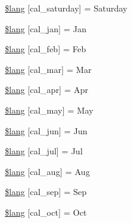 \begin{DoxyCompactItemize}
\hyperlink{system_2language_2english_2calendar__lang_8php_aff3fc79a60ccf1f09bfe1f4387105c4b}{\$lang} \mbox{[}\textquotesingle{}cal\+\_\+saturday\textquotesingle{}\mbox{]} = \textquotesingle{}Saturday\textquotesingle{}
\item 
\hyperlink{system_2language_2english_2calendar__lang_8php_a830b34d4425cdab2632056ef2860de62}{\$lang} \mbox{[}\textquotesingle{}cal\+\_\+jan\textquotesingle{}\mbox{]} = \textquotesingle{}Jan\textquotesingle{}
\item 
\hyperlink{system_2language_2english_2calendar__lang_8php_ac26ad55691325913e5d0f7156c95ff18}{\$lang} \mbox{[}\textquotesingle{}cal\+\_\+feb\textquotesingle{}\mbox{]} = \textquotesingle{}Feb\textquotesingle{}
\item 
\hyperlink{system_2language_2english_2calendar__lang_8php_a22ee24632deb286ad4efb833e2fe7533}{\$lang} \mbox{[}\textquotesingle{}cal\+\_\+mar\textquotesingle{}\mbox{]} = \textquotesingle{}Mar\textquotesingle{}
\item 
\hyperlink{system_2language_2english_2calendar__lang_8php_a61653bb502ac4775a4186ae145e9ff78}{\$lang} \mbox{[}\textquotesingle{}cal\+\_\+apr\textquotesingle{}\mbox{]} = \textquotesingle{}Apr\textquotesingle{}
\item 
\hyperlink{system_2language_2english_2calendar__lang_8php_a7e77a974617dd3fd0ab8d66f59125fdb}{\$lang} \mbox{[}\textquotesingle{}cal\+\_\+may\textquotesingle{}\mbox{]} = \textquotesingle{}May\textquotesingle{}
\item 
\hyperlink{system_2language_2english_2calendar__lang_8php_aabea2be5e0612f96b8d388183c4a3ebb}{\$lang} \mbox{[}\textquotesingle{}cal\+\_\+jun\textquotesingle{}\mbox{]} = \textquotesingle{}Jun\textquotesingle{}
\item 
\hyperlink{system_2language_2english_2calendar__lang_8php_a65585e0f8fda86a900ced005f0bb3c16}{\$lang} \mbox{[}\textquotesingle{}cal\+\_\+jul\textquotesingle{}\mbox{]} = \textquotesingle{}Jul\textquotesingle{}
\item 
\hyperlink{system_2language_2english_2calendar__lang_8php_ab7a387970f84455d8f289020761aeb83}{\$lang} \mbox{[}\textquotesingle{}cal\+\_\+aug\textquotesingle{}\mbox{]} = \textquotesingle{}Aug\textquotesingle{}
\item 
\hyperlink{system_2language_2english_2calendar__lang_8php_a09ed21f8320998bf99f89cc5121a69b2}{\$lang} \mbox{[}\textquotesingle{}cal\+\_\+sep\textquotesingle{}\mbox{]} = \textquotesingle{}Sep\textquotesingle{}
\item 
\hyperlink{system_2language_2english_2calendar__lang_8php_af4d1254dc312bf5e945d47d1011f35f7}{\$lang} \mbox{[}\textquotesingle{}cal\+\_\+oct\textquotesingle{}\mbox{]} = \textquotesingle{}Oct\textquotesingle{}

\end{DoxyCompactItemize}
